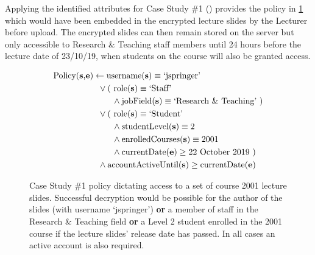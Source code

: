 Applying the identified attributes for Case Study \#1 () provides the policy in \cref{fig:case_study_policy_1} which would have been embedded in the encrypted lecture slides by the Lecturer before upload. The encrypted slides can then remain stored on the server but only accessible to Research \& Teaching staff members until 24 hours before the lecture date of 23/10/19, when students on the course will also be granted access.

\begin{figure}[ht]
  \centering
\begin{align*}
  \text{Policy(\textbf{s},\textbf{e})}
  &
    \leftarrow
    \text{username(\textbf{s})} \equiv \text{`jspringer'}
  \\
  &
    \phantom{::}\vee
    \text{( role(\textbf{s})} \equiv \text{`Staff'}
  \\
  &
    \phantom{::::::::}\wedge
    \text{jobField(\textbf{s})} \equiv \text{`Research \& Teaching' )}
  \\
  &
    \phantom{::}\vee
    \text{( role(\textbf{s})} \equiv \text{`Student'}
  \\
  &
    \phantom{::::::::}\wedge
    \text{studentLevel(\textbf{s})} \equiv \text{2}
  \\
  &
    \phantom{::::::::}\wedge
    \text{enrolledCourses(\textbf{s})} \equiv \text{2001}
  \\
  &
    \phantom{::::::::}\wedge
    \text{currentDate(\textbf{e})} \geq \text{22 October 2019 )}
  \\
  &
    \phantom{::}\wedge
    \text{accountActiveUntil(\textbf{s})} \geq \text{currentDate(\textbf{e})}
\end{align*}
  \caption{
    \label{fig:case_study_policy_1}
    Case Study \#1 policy dictating access to a set of course 2001 lecture slides.
    Successful decryption would be possible for the author of the slides (with username `jspringer') \textbf{or} a member of staff in the Research \& Teaching field \textbf{or} a Level 2 student enrolled in the 2001 course if the lecture slides' release date has passed. In all cases an active account is also required.
  }
\end{figure}
